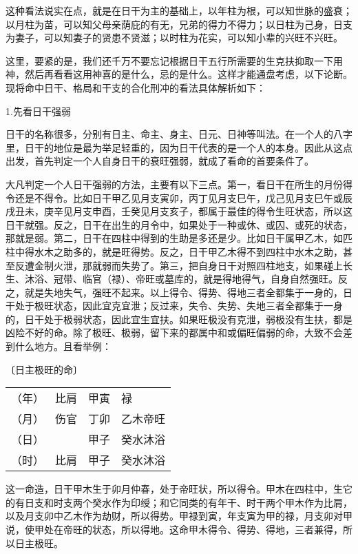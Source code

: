 \documentclass[a5paper,oneside,12pt]{ctexbook}
\begin{document}
这种看法说实在点，就是在日干为主的基础上，以年柱为根，可以知世脉的盛衰；以月柱为苗，可以知父母亲荫庇的有无，兄弟的得力不得力；以日柱为己身，日支为妻子，可以知妻子的贤患不贤滋；以时柱为花实，可以知小辈的兴旺不兴旺。

这里，要紧的是，我们还千万不要忘记根据日干五行所需要的生克扶抑取一下用神，然后再看看这用神喜的是什么，忌的是什么。这样才能通盘考虑，以下论断。现将命中日干、格局和干支的合化刑冲的看法具体解析如下：

1.先看日干强弱

日干的名称很多，分别有日主、命主、身主、日元、日神等叫法。在一个人的八字里，日干的地位是最为举足轻重的，因为日干代表的是一个人的本身。因此从这点出发，首先判定一个人自身日干的衰旺强弱，就成了看命的首要条件了。

大凡判定一个人日干强弱的方法，主要有以下三点。第一，看日干在所生的月份得令还是不得令。比如日干甲乙见月支寅卯，丙丁见月支巳午，戊己见月支巳午或辰戌丑未，庚辛见月支申酉，壬癸见月支亥子，都属于最佳的得令生旺状态，所以这日干就强。反之，日干在出生的月令中，如果处于一种或休、或囚、或死的状态，那就是弱。第二，日干在四柱中得到的生助是多还是少。比如日干属甲乙木，如匹柱中得水木之助多的，就是旺得势。反之，日干甲乙木得不到四柱中水木之助，甚至反遭金制火泄，那就弱而失势了。第三，把自身日干对照四柱地支，如果碰上长生、沐浴、冠带、临官（禄）、帝旺或墓库的，就是得地得气，自身自然强旺。反之，就是失地失气，强旺不起来。以上得令、得势、得地三者全都集于一身的，日干处于极旺状态，因此宜克宜泄；反过来，失令、失势、失地三者全都集于一身的，日干处于极弱状态，因此宜生宜扶。如果旺极没有克泄，弱极没有生扶，都是凶险不好的命。除了极旺、极弱，留下来的都属中和或偏旺偏弱的命，大致不会差到什么地方。且看举例：

〔日主极旺的命〕\par
\setlength{\tabcolsep}{0em} %
\begin{tabular}{cm{3em}<{\raggedleft}cl} %
（年）&\scriptsize{比肩}&甲寅&\scriptsize{禄}\\
（月）&\scriptsize{伤官}&丁卯&\scriptsize{乙木帝旺}\\
（日）&&甲子&\scriptsize{癸水沐浴}\\
（时）&\scriptsize{比肩}&甲子&\scriptsize{癸水沐浴}\\
\end{tabular}

这一命造，日干甲木生于卯月仲春，处于帝旺状，所以得令。甲木在四柱中，生它的有日支和时支两个癸水作为印绶；和它同类的有年干、时干两个甲木作为比肩，以及月支卯中乙木作为劫财，所以得势。甲禄到寅，年支寅为甲的禄，月支卯对甲说，使甲处在帝旺的状态，所以得地。这命甲木得令、得势、得地，三者兼得，所以日主极旺。
\end{document}
